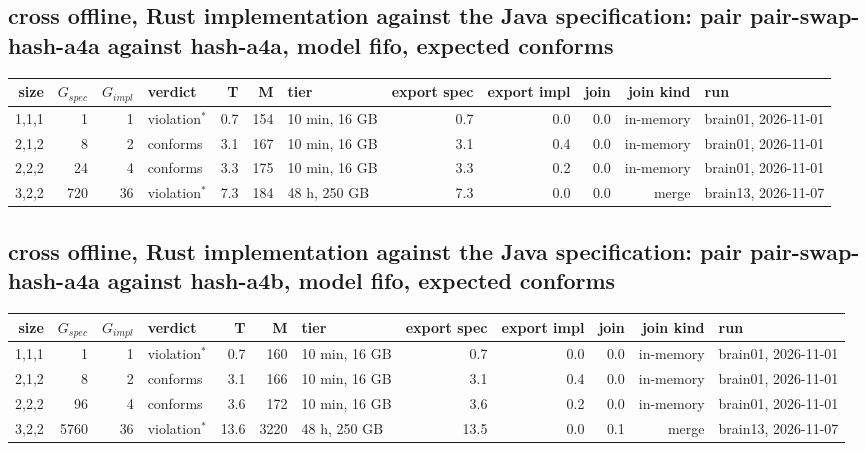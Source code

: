 \documentclass[10pt]{article}
\begin{document}
\subsection*{cross offline, Rust implementation against the Java specification: pair \textsf{pair-swap-hash-a4a} against \textsf{hash-a4a}, model fifo, expected conforms}
\begin{longtable}{@{}rrrlrrlrrrrl@{}}
\toprule
size & $G_{\mathit{spec}}$ & $G_{\mathit{impl}}$ & verdict & T & M & tier & export spec & export impl & join & join kind & run \\
\midrule
\endhead
\color{red} 1,1,1 & 1 & 1 & violation$^{\ast}$ & 0.7 & 154 & 10 min, 16 GB & 0.7 & 0.0 & 0.0 & in-memory & brain01, 2026-11-01 \\
\color{red} 2,1,2 & 8 & 2 & conforms & 3.1 & 167 & 10 min, 16 GB & 3.1 & 0.4 & 0.0 & in-memory & brain01, 2026-11-01 \\
\color{red} 2,2,2 & 24 & 4 & conforms & 3.3 & 175 & 10 min, 16 GB & 3.3 & 0.2 & 0.0 & in-memory & brain01, 2026-11-01 \\
\color{red} 3,2,2 & 720 & 36 & violation$^{\ast}$ & 7.3 & 184 & 48 h, 250 GB & 7.3 & 0.0 & 0.0 & merge & brain13, 2026-11-07 \\
\bottomrule
\end{longtable}
\subsection*{cross offline, Rust implementation against the Java specification: pair \textsf{pair-swap-hash-a4a} against \textsf{hash-a4b}, model fifo, expected conforms}
\begin{longtable}{@{}rrrlrrlrrrrl@{}}
\toprule
size & $G_{\mathit{spec}}$ & $G_{\mathit{impl}}$ & verdict & T & M & tier & export spec & export impl & join & join kind & run \\
\midrule
\endhead
\color{red} 1,1,1 & 1 & 1 & violation$^{\ast}$ & 0.7 & 160 & 10 min, 16 GB & 0.7 & 0.0 & 0.0 & in-memory & brain01, 2026-11-01 \\
\color{red} 2,1,2 & 8 & 2 & conforms & 3.1 & 166 & 10 min, 16 GB & 3.1 & 0.4 & 0.0 & in-memory & brain01, 2026-11-01 \\
\color{red} 2,2,2 & 96 & 4 & conforms & 3.6 & 172 & 10 min, 16 GB & 3.6 & 0.2 & 0.0 & in-memory & brain01, 2026-11-01 \\
\color{red} 3,2,2 & 5760 & 36 & violation$^{\ast}$ & 13.6 & 3220 & 48 h, 250 GB & 13.5 & 0.0 & 0.1 & merge & brain13, 2026-11-07 \\
\bottomrule
\end{longtable}
\end{document}

